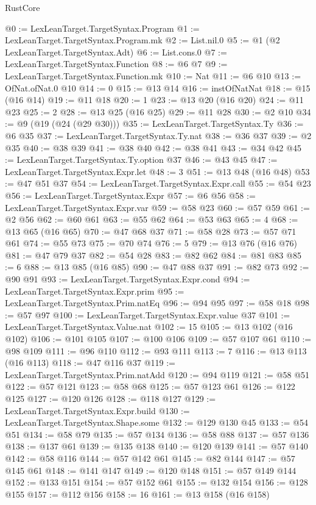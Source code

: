 \begin{lexlean}{RustCore}
\begin{coremodule}
@0 := LexLeanTarget.TargetSyntax.Program
@1 := LexLeanTarget.TargetSyntax.Program.mk
@2 := List.nil.{0}
@5 := @1 (@2 LexLeanTarget.TargetSyntax.Adt)
@6 := List.cons.{0}
@7 := LexLeanTarget.TargetSyntax.Function
@8 := @6 @7
@9 := LexLeanTarget.TargetSyntax.Function.mk
@10 := Nat
@11 := @6 @10
@13 := OfNat.ofNat.{0} @10
@14 := 0
@15 := @13 @14
@16 := instOfNatNat
@18 := @15 (@16 @14)
@19 := @11 @18
@20 := 1
@23 := @13 @20 (@16 @20)
@24 := @11 @23
@25 := 2
@28 := @13 @25 (@16 @25)
@29 := @11 @28
@30 := @2 @10
@34 := @9 (@19 (@24 (@29 @30)))
@35 := LexLeanTarget.TargetSyntax.Ty
@36 := @6 @35
@37 := LexLeanTarget.TargetSyntax.Ty.nat
@38 := @36 @37
@39 := @2 @35
@40 := @38 @39
@41 := @38 @40
@42 := @38 @41
@43 := @34 @42
@45 := LexLeanTarget.TargetSyntax.Ty.option @37
@46 := @43 @45
@47 := LexLeanTarget.TargetSyntax.Expr.let
@48 := 3
@51 := @13 @48 (@16 @48)
@53 := @47 @51 @37
@54 := LexLeanTarget.TargetSyntax.Expr.call
@55 := @54 @23
@56 := LexLeanTarget.TargetSyntax.Expr
@57 := @6 @56
@58 := LexLeanTarget.TargetSyntax.Expr.var
@59 := @58 @23
@60 := @57 @59
@61 := @2 @56
@62 := @60 @61
@63 := @55 @62
@64 := @53 @63
@65 := 4
@68 := @13 @65 (@16 @65)
@70 := @47 @68 @37
@71 := @58 @28
@73 := @57 @71 @61
@74 := @55 @73
@75 := @70 @74
@76 := 5
@79 := @13 @76 (@16 @76)
@81 := @47 @79 @37
@82 := @54 @28
@83 := @82 @62
@84 := @81 @83
@85 := 6
@88 := @13 @85 (@16 @85)
@90 := @47 @88 @37
@91 := @82 @73
@92 := @90 @91
@93 := LexLeanTarget.TargetSyntax.Expr.cond
@94 := LexLeanTarget.TargetSyntax.Expr.prim
@95 := LexLeanTarget.TargetSyntax.Prim.natEq
@96 := @94 @95
@97 := @58 @18
@98 := @57 @97
@100 := LexLeanTarget.TargetSyntax.Expr.value @37
@101 := LexLeanTarget.TargetSyntax.Value.nat
@102 := 15
@105 := @13 @102 (@16 @102)
@106 := @101 @105
@107 := @100 @106
@109 := @57 @107 @61
@110 := @98 @109
@111 := @96 @110
@112 := @93 @111
@113 := 7
@116 := @13 @113 (@16 @113)
@118 := @47 @116 @37
@119 := LexLeanTarget.TargetSyntax.Prim.natAdd
@120 := @94 @119
@121 := @58 @51
@122 := @57 @121
@123 := @58 @68
@125 := @57 @123 @61
@126 := @122 @125
@127 := @120 @126
@128 := @118 @127
@129 := LexLeanTarget.TargetSyntax.Expr.build
@130 := LexLeanTarget.TargetSyntax.Shape.some
@132 := @129 @130 @45
@133 := @54 @51
@134 := @58 @79
@135 := @57 @134
@136 := @58 @88
@137 := @57 @136
@138 := @137 @61
@139 := @135 @138
@140 := @120 @139
@141 := @57 @140
@142 := @58 @116
@144 := @57 @142 @61
@145 := @82 @144
@147 := @57 @145 @61
@148 := @141 @147
@149 := @120 @148
@151 := @57 @149 @144
@152 := @133 @151
@154 := @57 @152 @61
@155 := @132 @154
@156 := @128 @155
@157 := @112 @156
@158 := 16
@161 := @13 @158 (@16 @158)

\end{coremodule}
\end{lexlean}
